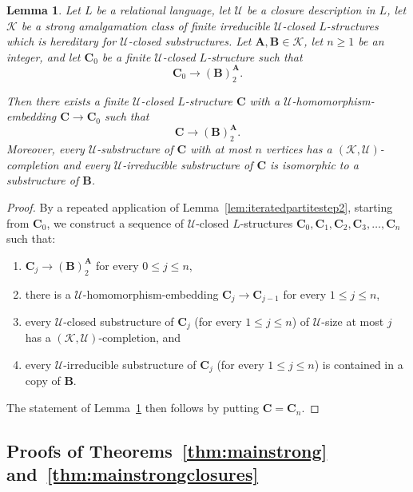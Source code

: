 \documentclass{elsarticle}
\def\str#1{\mathbf {#1}}
\def\K{{\mathcal K}}
\theoremstyle{plain}
\newtheorem{lemma}[theorem]{Lemma}
\theoremstyle{definition}
\theoremstyle{remark}
\begin{document}
\begin{lemma}
\label{lem:iteratedpartite2}
Let $L$ be a relational language, let $\mathcal U$ be a closure description in $L$, let $\mathcal K$ be a strong amalgamation class of finite irreducible $\mathcal U$-closed
$L$-structures which is hereditary for $\mathcal U$-closed substructures.
Let $\str{A},\str{B}\in \mathcal K$, let $n\geq 1$ be an integer,
and let $\str{C}_0$ be a finite $\mathcal U$-closed $L$-structure such that $$\str{C}_0 \longrightarrow (\str{B})^{\str{A}}_2.$$

Then there exists a finite $\mathcal U$-closed $L$-structure $\str{C}$ with a $\mathcal U$-homomorphism-embedding $\str{C}\to \str{C}_0$
such that
$$\str{C} \longrightarrow (\str{B})^{\str{A}}_2.$$
Moreover, every $\mathcal U$-substructure of $\str{C}$ with at most $n$ vertices has a $(\K,\mathcal U)$-completion
and every $\mathcal U$-irreducible substructure of $\str{C}$ is isomorphic to a substructure of $\str{B}$. 
\end{lemma}


\begin{proof}[Proof]
By a repeated application of Lemma~\ref{lem:iteratedpartitestep2}, starting from $\str{C}_0$,
we construct a sequence of $\mathcal U$-closed $L$-structures 
$\str C_0, \str{C}_1, \str{C}_2, \str{C}_3, \ldots, \str{C}_n$ such that:
\begin{enumerate}[label=(\roman*)]
\item $\str{C}_j \longrightarrow (\str{B})^{\str{A}}_2$ for every $0\leq j\leq n$,
\item there is a $\mathcal U$-homomorphism-embedding $\str{C}_j\to \str{C}_{j-1}$ for every $1\leq j\leq n$,
\item every $\mathcal U$-closed substructure of $\str{C}_j$ (for every $1\leq j\leq n$) of $\mathcal U$-size at most $j$ has a $(\K,\mathcal U)$-completion, and
\item every $\mathcal U$-irreducible substructure of $\str{C}_j$ (for every $1\leq j\leq n$) is contained in a copy of $\str{B}$.
\end{enumerate}

The statement of Lemma~\ref{lem:iteratedpartite2} then follows by putting $\str{C}=\str{C}_n$.
\end{proof}

\subsection{Proofs of Theorems~\ref{thm:mainstrong} and~\ref{thm:mainstrongclosures}}
\label{sec:mainres}
\end{document}
